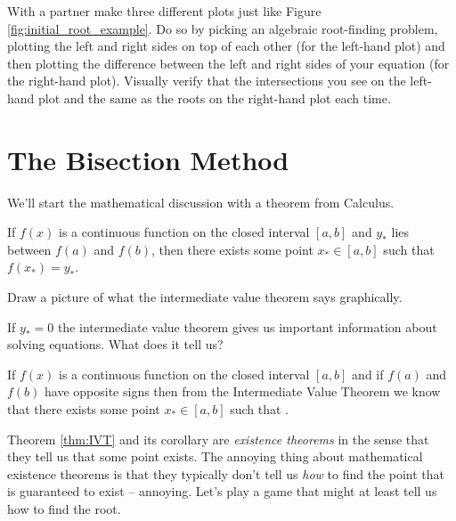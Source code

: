 \begin{problem}
    With a partner make three different plots just like Figure
    \ref{fig:initial_root_example}.  Do so by picking an algebraic root-finding problem,
    plotting the left and right sides on top of each other (for the left-hand plot) and
    then plotting the difference between the left and right sides of your equation (for
    the right-hand plot).  Visually verify that the intersections you see on the left-hand
    plot and the same as the roots on the right-hand plot each time.
\end{problem}

\newpage
\section{The Bisection Method}
We'll start the mathematical discussion with a theorem from Calculus.
\begin{thm}
    If $f(x)$ is a continuous function on the closed interval $[a,b]$ and $y_*$ lies between
    $f(a)$ and $f(b)$, then there exists some point $x_* \in [a,b]$ such that $f(x_*) = y_*$.
    \label{thm:IVT}
\end{thm}


\begin{problem}
    Draw a picture of what the intermediate value theorem says graphically.
\end{problem}

\begin{problem}
    If $y_*=0$ the intermediate value theorem gives us important information about solving
    equations.  What does it tell us?
\end{problem}

\begin{cor}
    If $f(x)$ is a continuous function on the closed interval $[a,b]$ and if $f(a)$ and $f(b)$ have opposite
    signs then from the Intermediate Value Theorem we know that there exists some point
    $x_* \in [a,b]$ such that \underline{\hspace{1in}}.
\end{cor}

Theorem \ref{thm:IVT} and its corollary are {\it existence theorems} in the sense that
they tell us that some point exists.  The annoying thing about mathematical existence
theorems is that they typically don't tell us {\it how} to find the point that is guaranteed to
exist -- annoying.  Let's play a game that might at least tell us how to find the root.

